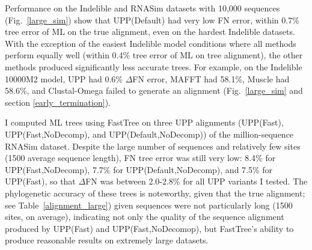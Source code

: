 Performance on the Indelible and 
RNASim  datasets with 10,000 sequences (Fig.~\ref{large_sim})
show that UPP(Default)  
had very low FN error, within 0.7\%  tree error of ML on 
the true alignment, even on the hardest Indelible datasets.  
With the exception of the easiest Indelible model conditions
where all methods perform equally well (within 0.4\% tree error of ML on tree alignment), 
the other methods produced significantly less accurate trees.  
For example, on the Indelible 10000M2 model, 
UPP had 0.6\% $\Delta$FN error,
 MAFFT had 58.1\%, Muscle had 58.6\%,  and 
Clustal-Omega failed to generate an alignment 
(Fig.~\ref{large_sim} and section \ref{early_termination}).  
  
I computed ML trees using
FastTree on three UPP alignments 
(UPP(Fast), UPP(Fast,NoDecomp), and  
UPP(Default,NoDecomp))
of the million-sequence RNASim dataset.
Despite the large number of 
sequences and relatively few sites (1500 average
sequence length), 
FN tree error was 
still very low: 8.4\% for UPP(Fast,NoDecomp),
 7.7\% for UPP(Default,NoDecomp),   and 7.5\% for UPP(Fast),
so that $\Delta$FN was between
2.0-2.8\% for all UPP variants I tested.
The phylogenetic accuracy  of these
trees is noteworthy, given that the  %
true alignment; see Table~\ref{alignment_large}) given
sequences were not particularly long  (1500 sites, on average),
indicating not only the quality of the
sequence alignment produced by UPP(Fast) and UPP(Fast,NoDecomop), but
FastTree's ability to produce reasonable results on
extremely large datasets.


